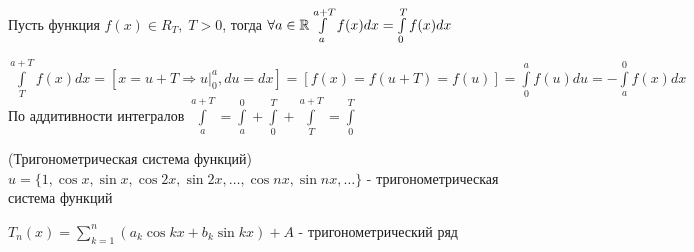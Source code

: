 \begin{Lem}
	Пусть функция $f(x) \in R_T, \; T > 0$, тогда $\forall a \in \mathbb{R} \int\limits_{a}^{a+T}f(x)dx = \int\limits_{0}^{T}f(x)dx$
\end{Lem}

\begin{Proof}
	$\int\limits_{T}^{a+T}f(x)dx = [x = u + T \Rightarrow u \big|_{0}^{a}, du = dx] = [f(x) = f(u + T) = f(u)] = \int\limits_{0}^{a}f(u)du = -\int\limits_{a}^{0}f(x)dx$\\
	По аддитивности интегралов $\int\limits_{a}^{a+T} = \int\limits_{a}^{0} + \int\limits_{0}^{T} + \int\limits_{T}^{a+T} = \int\limits_{0}^{T}$
\end{Proof}

\begin{Def}(Тригонометрическая система функций)\\
	$u = \{1, \cos x, \sin x, \cos 2x, \sin 2x, \dots, \cos nx, \sin nx, \dots\}$ - тригонометрическая система функций
\end{Def}

\begin{Def}
	$T_n(x) = \sum\limits_{k=1}^{n} (a_k\cos kx + b_k\sin kx) + A$ - тригонометрический ряд
\end{Def}